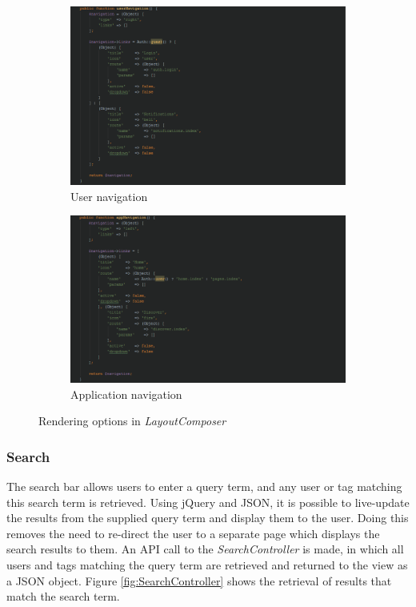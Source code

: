 \begin{figure}[H]
\centering
\begin{subfigure}[b]{1\linewidth}
    \includegraphics[width=1\textwidth]{Images/Implementation/UserNavigation}
    \caption{User navigation}
    \label{fig:UserNavigation}
\end{subfigure}
\begin{subfigure}[b]{1\linewidth}
    \includegraphics[width=1\textwidth]{Images/Implementation/AppNavigation}
    \caption{Application navigation}
    \label{fig:AppNavigation}
\end{subfigure}
\caption{Rendering options in \emph{LayoutComposer}}
\label{fig:LayoutComposerNav}
\end{figure}

\subsubsection{Search}
The search bar allows users to enter a query term, and any user or tag matching this search term is retrieved. Using jQuery and JSON, it is possible to live-update the results from the supplied query term and display them to the user. Doing this removes the need to re-direct the user to a separate page which displays the search results to them. An API call to the \textit{SearchController} is made, in which all users and tags matching the query term are retrieved and returned to the view as a JSON object. Figure \ref{fig:SearchController} shows the retrieval of results that match the search term.

